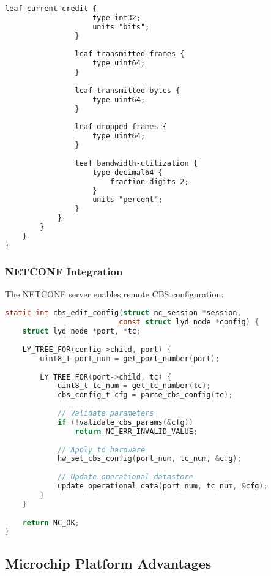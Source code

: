 \documentclass[10pt, journal, compsoc]{IEEEtran}
\begin{document}
\begin{lstlisting}[language=XML, caption=CBS YANG Model Extract]
                leaf current-credit {
                    type int32;
                    units "bits";
                }
                
                leaf transmitted-frames {
                    type uint64;
                }
                
                leaf transmitted-bytes {
                    type uint64;
                }
                
                leaf dropped-frames {
                    type uint64;
                }
                
                leaf bandwidth-utilization {
                    type decimal64 {
                        fraction-digits 2;
                    }
                    units "percent";
                }
            }
        }
    }
}
\end{lstlisting}

\subsubsection{NETCONF Integration}

The NETCONF server enables remote CBS configuration:

\begin{lstlisting}[language=C, caption=NETCONF Operation Handler]
static int cbs_edit_config(struct nc_session *session,
                          const struct lyd_node *config) {
    struct lyd_node *port, *tc;
    
    LY_TREE_FOR(config->child, port) {
        uint8_t port_num = get_port_number(port);
        
        LY_TREE_FOR(port->child, tc) {
            uint8_t tc_num = get_tc_number(tc);
            cbs_config_t cfg = parse_cbs_config(tc);
            
            // Validate parameters
            if (!validate_cbs_params(&cfg))
                return NC_ERR_INVALID_VALUE;
            
            // Apply to hardware
            hw_set_cbs_config(port_num, tc_num, &cfg);
            
            // Update operational datastore
            update_operational_data(port_num, tc_num, &cfg);
        }
    }
    
    return NC_OK;
}
\end{lstlisting}

\subsection{Microchip Platform Advantages}
\end{document}
